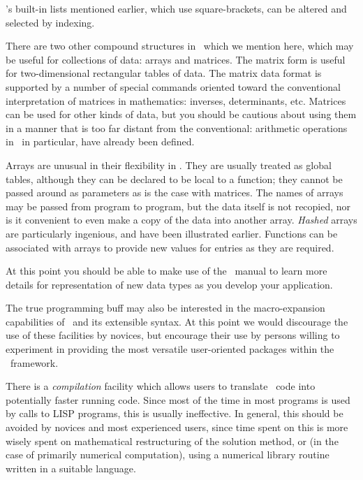 \Max's built-in lists mentioned earlier, which use square-brackets, 
can be altered and selected by indexing.

There are two other compound structures in \Max\
which we mention here, which may be useful for
collections of data: arrays and matrices.
The matrix form is useful for two-dimensional rectangular tables of
data.  The matrix data format is supported by a number of special
commands oriented toward the conventional interpretation of
matrices in mathematics: inverses, determinants, etc.
Matrices can be used for other kinds of data, but you should be
cautious about using them in a manner that is too far distant from
the conventional: arithmetic operations in \Max\,
in particular, have already been defined.

Arrays are unusual in their flexibility in \Max.
They are usually treated as global tables, although they can be
declared to be local to a function; they cannot be passed around 
as parameters as is the case with matrices.  The
names of arrays may be passed from program to program, but the data
itself is not recopied, nor is it convenient to even make a copy
of the data into another array. {\it Hashed} arrays are particularly
ingenious, and have been illustrated earlier. Functions can be associated
with arrays to provide new values for entries as they are required.

At this point you should be able to make use of the
\Max\
manual to learn more details for representation of
new data types as you develop your application.

The true programming buff may also be interested in the macro-expansion
capabilities of
\Max\
and its extensible syntax.  At this point we would discourage the use of
these facilities by novices, but encourage their use by persons willing
to experiment in providing the most versatile user-oriented packages within
the
\Max\
framework.

There is a {\it compilation} facility which allows users to translate
\Max\
code into potentially faster running code.  Since most of the time in
most programs is used by calls to LISP programs, this is usually ineffective.
In general, this should be avoided by novices and most experienced users, since
time spent on this is more wisely spent on mathematical restructuring of
the solution method, or (in the case of primarily numerical computation),
using a numerical library routine written in a suitable language.
